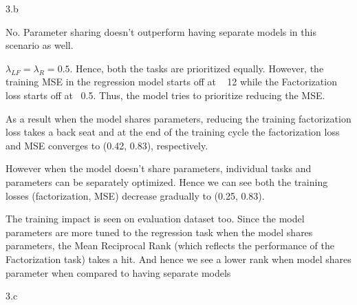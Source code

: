 \clearpage

\LARGE
3.b
\normalsize

\begin{answer}
No. Parameter sharing doesn't outperform having separate models in this scenario as well. 

$\lambda_{LF} = \lambda_{R} = 0.5$. Hence, both the tasks are prioritized equally. However, the training MSE in the regression model starts off at ~ 12 while the Factorization loss starts off at ~0.5. Thus, the model tries to prioritize reducing the MSE. 

As a result when the model shares parameters, reducing the training factorization loss takes a back seat and at the end of the training cycle the factorization loss and MSE converges to (0.42, 0.83), respectively. 

However when the model doesn't share parameters, individual tasks and parameters can be separately optimized. Hence we can see both the training losses (factorization, MSE) decrease gradually to (0.25, 0.83). 

The training impact is seen on evaluation dataset too. Since the model parameters are more tuned to the regression task when the model shares parameters, the Mean Reciprocal Rank (which reflects the performance of the Factorization task) takes a hit. And hence we see a lower rank when model shares parameter when compared to having separate models

\end{answer}

\clearpage

\LARGE
3.c
\normalsize

